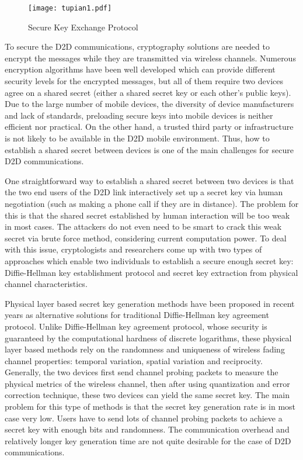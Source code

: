 \documentclass[conference]{IEEEtran}
\begin{document}
\begin{figure*}[ht]
  \centering
  \scalebox{0.7}
  {\texttt{[image: tupian1.pdf]}}
  \caption{Secure Key Exchange Protocol}
  \label{fig:protocol}
    \vspace{-3mm}
\end{figure*}

To secure the D2D communications, cryptography solutions are needed to encrypt the messages while they are transmitted via wireless channels. Numerous encryption algorithms have been well developed which can provide different security levels for the encrypted messages, but all of them require two devices agree on a shared secret (either a shared secret key or each other's public keys). Due to the large number of mobile devices, the diversity of device manufacturers and lack of standards, preloading secure keys into mobile devices is neither efficient nor practical. On the other hand, a trusted third party or infrastructure is not likely to be available in the D2D mobile environment. Thus, how to establish a shared secret between devices is one of the main challenges for secure D2D communications.

One straightforward way to establish a shared secret between two devices is that the two end users of the D2D link interactively set up a secret key via human negotiation (such as making a phone call if they are in distance). The problem for this is that the shared secret established by human interaction will be too weak in most cases. The attackers do not even need to be smart to crack this weak secret via brute force method, considering current computation power. To deal with this issue, cryptologists and researchers come up with two types of approaches which enable two individuals to establish a secure enough secret key: Diffie-Hellman key establishment protocol and secret key extraction from physical channel characteristics.

Physical layer based secret key generation methods have been proposed in recent years as alternative solutions for traditional Diffie-Hellman key agreement protocol. Unlike Diffie-Hellman key agreement protocol, whose security is guaranteed by the computational hardness of discrete logarithms, these physical layer based methods rely on the randomness and uniqueness of wireless fading channel properties: temporal variation, spatial variation and reciprocity. Generally, the two devices first send channel probing packets to measure the physical metrics of the wireless channel, then after using quantization and error correction technique, these two devices can yield the same secret key. The main problem for this type of methods is that the secret key generation rate is in most case very low. Users have to send lots of channel probing packets to achieve a secret key with enough bits and randomness. The communication overhead and relatively longer key generation time are not quite desirable for the case of D2D communications.
\end{document}
